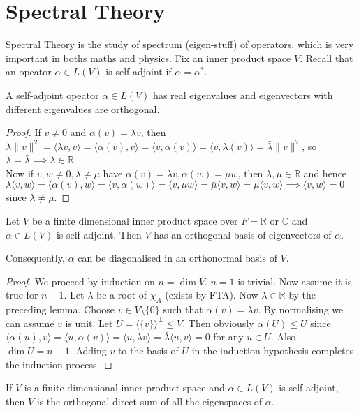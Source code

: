 \section{Spectral Theory}
Spectral Theory is the study of spectrum (eigen-stuff) of operators, which is very important in boths maths and physics.
Fix an inner product space $V$.
Recall that an opeator $\alpha\in L(V)$ is self-adjoint if $\alpha=\alpha^\ast$.
\begin{lemma}
    A self-adjoint opeator $\alpha\in L(V)$ has real eigenvalues and eigenvectors with different eigenvalues are orthogonal.
\end{lemma}
\begin{proof}
    If $v\neq 0$ and $\alpha(v)=\lambda v$, then $\lambda\|v\|^2=\langle \lambda v,v\rangle=\langle\alpha(v),v\rangle=\langle v,\alpha(v)\rangle=\langle v,\lambda(v)\rangle=\bar\lambda\|v\|^2$, so $\lambda=\bar\lambda\implies\lambda\in\mathbb R$.\\
    Now if $v,w\neq 0,\lambda\neq\mu$ have $\alpha(v)=\lambda v,\alpha(w)=\mu w$, then $\lambda,\mu\in\mathbb R$ and hence $\lambda\langle v,w\rangle=\langle\alpha(v),w\rangle=\langle v,\alpha(w)\rangle=\langle v,\mu w\rangle=\bar\mu\langle v,w\rangle=\mu\langle v,w\rangle\implies\langle v,w\rangle=0$ since $\lambda\neq\mu$.
\end{proof}
\begin{theorem}
    Let $V$ be a finite dimensional inner product space over $F=\mathbb R$ or $\mathbb C$ and $\alpha\in L(V)$ is self-adjoint.
    Then $V$ has an orthogonal basis of eigenvectors of $\alpha$.
\end{theorem}
Consequently, $\alpha$ can be diagonalised in an orthonormal basis of $V$.
\begin{proof}
    We proceed by induction on $n=\dim V$.
    $n=1$ is trivial.
    Now assume it is true for $n-1$.
    Let $\lambda$ be a root of $\chi_A$ (exists by FTA).
    Now $\lambda\in\mathbb R$ by the preceding lemma.
    Choose $v\in V\setminus\{0\}$ such that $\alpha(v)=\lambda v$.
    By normalising we can assume $v$ is unit.
    Let $U=\langle \{v\}\rangle^\perp\le V$.
    Then obviously $\alpha(U)\le U$ since $\langle\alpha(u),v\rangle=\langle u,\alpha(v)\rangle=\langle u,\lambda v\rangle=\bar\lambda\langle u,v\rangle=0$ for any $u\in U$.
    Also $\dim U=n-1$.
    Adding $v$ to the basis of $U$ in the induction hypothesis completes the induction process.
\end{proof}
\begin{corollary}
    If $V$ is a finite dimensional inner product space and $\alpha\in L(V)$ is self-adjoint, then $V$ is the orthogonal direct sum of all the eigenspaces of $\alpha$.
\end{corollary}
